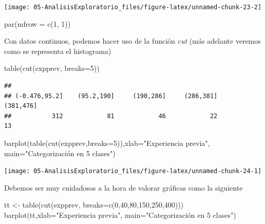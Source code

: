 \documentclass[
]{book}
\newenvironment{Shaded}{\begin{snugshade}}{\end{snugshade}}
\newcommand{\AttributeTok}[1]{\textcolor[rgb]{0.77,0.63,0.00}{#1}}
\newcommand{\DecValTok}[1]{\textcolor[rgb]{0.00,0.00,0.81}{#1}}
\newcommand{\FunctionTok}[1]{\textcolor[rgb]{0.00,0.00,0.00}{#1}}
\newcommand{\NormalTok}[1]{#1}
\newcommand{\OtherTok}[1]{\textcolor[rgb]{0.56,0.35,0.01}{#1}}
\newcommand{\StringTok}[1]{\textcolor[rgb]{0.31,0.60,0.02}{#1}}
\theoremstyle{break}
\theoremstyle{nonumberplain}
\begin{document}
\begin{center}\texttt{[image: 05-AnalisisExploratorio\_files/figure-latex/unnamed-chunk-23-2]} \end{center}

\begin{Shaded}
\begin{Highlighting}[]
\FunctionTok{par}\NormalTok{(}\AttributeTok{mfrow =} \FunctionTok{c}\NormalTok{(}\DecValTok{1}\NormalTok{, }\DecValTok{1}\NormalTok{))}
\end{Highlighting}
\end{Shaded}

Con datos continuos, podemos hacer uso de la función \emph{cut}
(más adelante veremos como se representa el histograma)

\begin{Shaded}
\begin{Highlighting}[]
\FunctionTok{table}\NormalTok{(}\FunctionTok{cut}\NormalTok{(expprev, }\AttributeTok{breaks=}\DecValTok{5}\NormalTok{))}
\end{Highlighting}
\end{Shaded}

\begin{verbatim}
## 
## (-0.476,95.2]    (95.2,190]     (190,286]     (286,381]     (381,476] 
##           312            81            46            22            13
\end{verbatim}

\begin{Shaded}
\begin{Highlighting}[]
\FunctionTok{barplot}\NormalTok{(}\FunctionTok{table}\NormalTok{(}\FunctionTok{cut}\NormalTok{(expprev,}\AttributeTok{breaks=}\DecValTok{5}\NormalTok{)),}\AttributeTok{xlab=}\StringTok{"Experiencia previa"}\NormalTok{,}
        \AttributeTok{main=}\StringTok{"Categorización en 5 clases"}\NormalTok{)}
\end{Highlighting}
\end{Shaded}

\begin{center}\texttt{[image: 05-AnalisisExploratorio\_files/figure-latex/unnamed-chunk-24-1]} \end{center}

Debemos ser muy cuidadosos a la hora de valorar gráficas como la siguiente

\begin{Shaded}
\begin{Highlighting}[]
\NormalTok{tt }\OtherTok{\textless{}{-}} \FunctionTok{table}\NormalTok{(}\FunctionTok{cut}\NormalTok{(expprev, }\AttributeTok{breaks=}\FunctionTok{c}\NormalTok{(}\DecValTok{0}\NormalTok{,}\DecValTok{40}\NormalTok{,}\DecValTok{80}\NormalTok{,}\DecValTok{150}\NormalTok{,}\DecValTok{250}\NormalTok{,}\DecValTok{400}\NormalTok{)))}
\FunctionTok{barplot}\NormalTok{(tt,}\AttributeTok{xlab=}\StringTok{"Experiencia previa"}\NormalTok{, }\AttributeTok{main=}\StringTok{"Categorización en 5 clases"}\NormalTok{)}
\end{Highlighting}
\end{Shaded}
\end{document}
